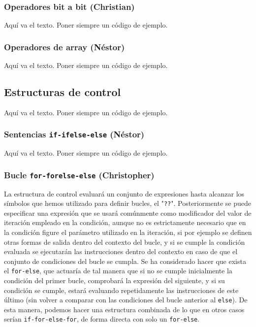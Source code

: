 \documentclass[11pt, english]{article}
\begin{document}
\subsubsection{Operadores bit a bit (Christian)}\label{bitwise-operators}
Aquí va el texto. Poner siempre un código de ejemplo.

\subsubsection{Operadores de array (Néstor)}
Aquí va el texto. Poner siempre un código de ejemplo.
\newpage

\subsection{Estructuras de control}
Aquí va el texto. Poner siempre un código de ejemplo.

\subsubsection{Sentencias \texttt{if-ifelse-else} (Néstor)}\label{if}
Aquí va el texto. Poner siempre un código de ejemplo.

\subsubsection{Bucle \texttt{for-forelse-else} (Christopher)}
La estructura de control evaluará un conjunto de expresiones hasta alcanzar los símbolos que hemos utilizado para definir bucles, el "\texttt{??}". Posteriormente se puede especificar una expresión que se usará comúnmente como modificador del valor de iteración empleado en la condición, aunque no es estrictamente necesario que en la condición figure el parámetro utilizado en la iteración, si por ejemplo se definen otras formas de salida dentro del contexto del bucle, y si se cumple la condición evaluada se ejecutarán las instrucciones dentro del contexto en caso de que el conjunto de condiciones del bucle se cumpla. Se ha considerado hacer que exista el \texttt{for-else}, que actuaría de tal manera que si no se cumple inicialmente la condición del primer bucle, comprobará la expresión del siguiente, y si su condición se cumple, estará evaluando repetidamente las instrucciones de este último (sin volver a comparar con las condiciones del bucle anterior al \texttt{else}). De esta manera, podemos hacer una estructura combinada de lo que en otros casos serían \texttt{if-for-else-for}, de forma directa con solo un \texttt{for-else}. \vspace{10px}
\end{document}
